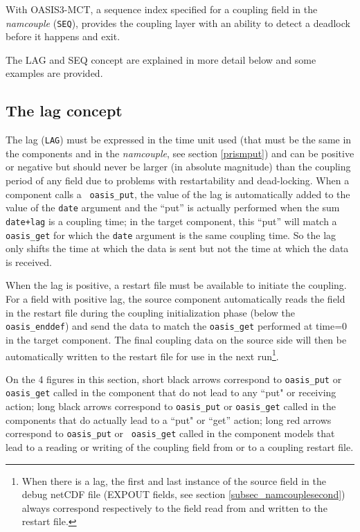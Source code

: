 With OASIS3-MCT, a sequence index specified for a coupling field in the {\it namcouple} ({\tt SEQ}), 
provides the coupling layer with an ability to detect a deadlock
before it happens and exit.

The LAG and SEQ concept are explained in more detail below and
some examples are provided.

\vspace{-0.3cm}
\subsection{The lag concept}
\label{subsub_lag}

The lag ({\tt LAG}) must be
expressed in the time unit used (that must be the same in the components
and in the {\it namcouple}, see section \ref{prismput}) and can be
positive or negative but should never be larger (in absolute
magnitude) than the coupling period of any field due to problems with
restartability and dead-locking. When a component calls a {\tt
  oasis\_put}, the value of the lag is automatically added to the
value of the {\tt date} argument and the ``put'' is actually performed
when the sum {\tt date+lag} is a coupling time; in the target
component, this ``put'' will match a {\tt oasis\_get} for which the
{\tt date} argument is the same coupling time.
So the lag only shifts the time at which the data is sent but not
the time at which the data is received.
 
When the lag is positive, a restart file must be available to initiate
the coupling.  For a field with positive lag, the source
component automatically reads the field in the restart file
during the coupling initialization phase (below the {\tt
  oasis\_enddef}) and send the data to match the {\tt oasis\_get}
performed at time=0 in the target component. The final coupling
data on the source side will then be automatically written to the
restart file for use in the next run\footnote{When there is a lag, the first and last instance of the source field
in the debug netCDF file (EXPOUT fields, see section
\ref{subsec_namcouplesecond}) always correspond respectively to the
field read from and written to the restart file.}.

On the 4 figures in this section, short black arrows correspond to
  {\tt oasis\_put} or {\tt oasis\_get} called in the component
  that do not lead to any ``put" or receiving action; long black
  arrows correspond to {\tt oasis\_put} or {\tt oasis\_get} called in
  the components that do actually lead to a ``put" or ``get''
  action; long red arrows correspond to {\tt oasis\_put} or {\tt
    oasis\_get} called in the component models that lead to a reading
  or writing of the coupling field from or to a coupling restart file.
 
